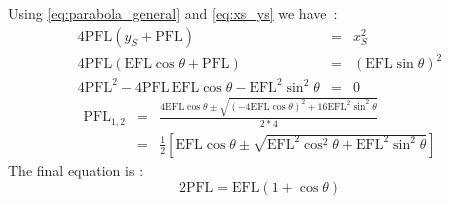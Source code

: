 Using \eqref{eq:parabola_general} and \eqref{eq:xs_ys} we have~:
\begin{eqnarray}
	4\text{PFL}\left(y_S+\text{PFL}\right) &= &x_S^2 \nonumber \\
	4\text{PFL}\left(\text{EFL}\cos\theta+\text{PFL}\right) &= &\left(\text{EFL}\sin\theta\right)^2\nonumber\\ 
	4\text{PFL}^2 - 4\text{PFL}\,\text{EFL}\cos\theta-\text{EFL}^2\sin^2\theta &= &0 \nonumber
\end{eqnarray}
\begin{eqnarray}
	\text{PFL}_{1,2} &= &\frac{4\text{EFL}\cos\theta\pm\sqrt{\left(-4\text{EFL}\cos\theta\right)^2+16\text{EFL}^2\sin^2\theta}}{2*4}  \nonumber\\
	&= &\frac{1}{2}\left[\text{EFL}\cos\theta\pm\sqrt{\text{EFL}^2\cos^2\theta+\text{EFL}^2\sin^2\theta}\right] \nonumber
\end{eqnarray}
The final equation is :
\begin{equation}
	2\text{PFL} = \text{EFL}\left(1+\cos\theta\right)\label{eq:EFL2PFL}
\end{equation}









